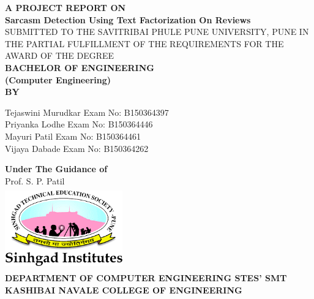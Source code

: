 \documentclass[oneside,a4paper,12pt]{book}
\begin{document}
\setlength{\parindent}{0mm}
\begin{center}

{\bfseries A  PROJECT REPORT ON \\}
 \vspace*{2\baselineskip}
{\bfseries \fontsize{16}{16} \selectfont  Sarcasm Detection Using Text Factorization On Reviews  \\ \vspace{5mm}}
{\fontsize{12}{12} \selectfont SUBMITTED TO THE SAVITRIBAI PHULE PUNE UNIVERSITY, PUNE
IN THE PARTIAL FULFILLMENT OF THE REQUIREMENTS 
FOR THE AWARD OF THE DEGREE
\\

\vspace*{2\baselineskip}}
{\bfseries \fontsize{14}{12} \selectfont BACHELOR OF ENGINEERING\\
 (Computer Engineering) \\
\vspace*{1\baselineskip}} 
{\bfseries \fontsize{14}{12} \selectfont BY \\ 
\vspace*{1\baselineskip}} 
\begin{flushleft}
\hspace{25 mm}Tejaswini Murudkar \hspace{25 mm} Exam No: B150364397  \\
\hspace{25 mm}Priyanka Lodhe \hspace{33 mm} Exam No: B150364446  \\
\hspace{25 mm}Mayuri Patil \hspace{38.5 mm} Exam No: B150364461  \\
\hspace{25 mm}Vijaya Dabade \hspace{35 mm} Exam No: B150364262  \\
\end{flushleft}
\vspace*{2\baselineskip}
{\bfseries \fontsize{14}{10} \selectfont Under The Guidance of \\  
\vspace*{1\baselineskip}} 
Prof. S. P. Patil\\[5mm]
\includegraphics[height=1.4in, width=2.0in,keepaspectratio]{logo.png}\\[8mm]
\fontsize{14}{14pt}\selectfont
\textbf{DEPARTMENT OF COMPUTER ENGINEERING\vspace*{1\baselineskip}
 STES' SMT KASHIBAI NAVALE COLLEGE OF ENGINEERING}\\


\end{center}
\end{document}
